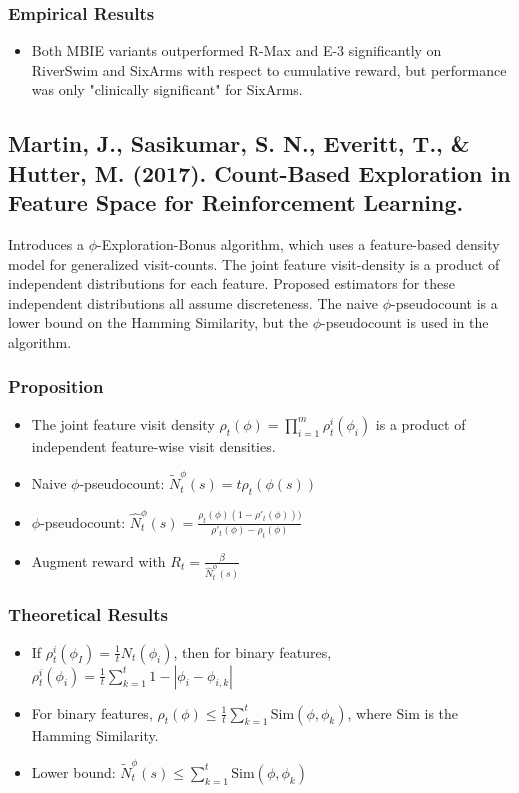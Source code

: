 \documentclass[12pt, oneside]{amsart}
\begin{document}
\subsubsection*{Empirical Results}

\begin{itemize}
	\item Both MBIE variants outperformed R-Max and E-3 significantly on RiverSwim and SixArms with respect to cumulative reward, but performance was only "clinically significant" for SixArms.
\end{itemize}

\subsection*{Martin, J., Sasikumar, S. N., Everitt, T., \& Hutter, M.  (2017). Count-Based Exploration in Feature Space for Reinforcement Learning.}
Introduces a $\phi$-Exploration-Bonus algorithm, which uses a feature-based density model for generalized visit-counts. The joint feature visit-density is a product of independent distributions for each feature. Proposed estimators for these independent distributions all assume discreteness. The naive $\phi$-pseudocount is a lower bound on the Hamming Similarity, but the $\phi$-pseudocount is used in the algorithm.

\subsubsection*{Proposition}
\begin{itemize}
	\item The joint feature visit density $\rho_t(\phi) = \prod_{i=1}^{m}\rho_t^i(\phi_i)$ is a product of independent feature-wise visit densities.
	\item Naive $\phi$-pseudocount: $\tilde{N}_t^\phi(s) = t\rho_t(\phi(s))$
	\item $\phi$-pseudocount: $\hat{N}_t^\phi(s) = \frac{\rho_t(\phi)(1-\rho'_t(\phi)))}{\rho'_t(\phi) - \rho_t(\phi)}$
	\item Augment reward with $R_t = \frac{\beta}{\hat{N}_t^\phi(s)}$
\end{itemize}

\subsubsection*{Theoretical Results}
\begin{itemize}
	\item If $\rho_t^i(\phi_I) = \frac{1}{t}N_t(\phi_i)$, then for binary features, $\rho_t^i(\phi_i) = \frac{1}{t}\sum_{k=1}^{t} 1-|\phi_i- \phi_{i,k}|$
	\item For binary features, $\rho_t(\phi) \leq \frac{1}{t} \sum_{k=1}^{t}\text{Sim}(\phi, \phi_k)$, where $\text{Sim}$ is the Hamming Similarity.
	\item Lower bound: $\tilde{N}_t^\phi(s) \leq \sum_{k=1}^{t}\text{Sim}(\phi, \phi_k)$
\end{itemize}
\end{document}

